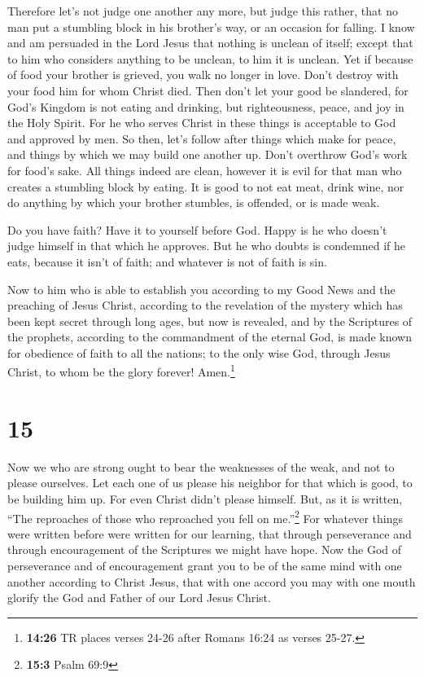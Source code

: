  Therefore let's not judge one another any more, but
judge this rather, that no man put a stumbling block in his brother's
way, or an occasion for falling.  I know and am persuaded
in the Lord Jesus that nothing is unclean of itself; except that to him
who considers anything to be unclean, to him it is unclean.
 Yet if because of food your brother is grieved, you walk
no longer in love. Don't destroy with your food him for whom Christ
died.  Then don't let your good be slandered,
 for God's Kingdom is not eating and drinking, but
righteousness, peace, and joy in the Holy Spirit.  For he
who serves Christ in these things is acceptable to God and approved by
men.  So then, let's follow after things which make for
peace, and things by which we may build one another up. 
Don't overthrow God's work for food's sake. All things indeed are clean,
however it is evil for that man who creates a stumbling block by eating.
 It is good to not eat meat, drink wine, nor do anything
by which your brother stumbles, is offended, or is made weak.

 Do you have faith? Have it to yourself before God. Happy
is he who doesn't judge himself in that which he approves.
 But he who doubts is condemned if he eats, because it
isn't of faith; and whatever is not of faith is sin.

 Now to him who is able to establish you according to my
Good News and the preaching of Jesus Christ, according to the revelation
of the mystery which has been kept secret through long ages,
 but now is revealed, and by the Scriptures of the
prophets, according to the commandment of the eternal God, is made known
for obedience of faith to all the nations;  to the only
wise God, through Jesus Christ, to whom be the glory forever!
Amen.\footnote{\textbf{14:26} TR places verses 24-26 after Romans 16:24
  as verses 25-27.}

\hypertarget{section-14}{%
\section{15}\label{section-14}}

 Now we who are strong ought to bear the weaknesses of the
weak, and not to please ourselves.  Let each one of us
please his neighbor for that which is good, to be building him up.
 For even Christ didn't please himself. But, as it is
written, ``The reproaches of those who reproached you fell on
me.''\footnote{\textbf{15:3} Psalm 69:9}  For whatever
things were written before were written for our learning, that through
perseverance and through encouragement of the Scriptures we might have
hope.  Now the God of perseverance and of encouragement
grant you to be of the same mind with one another according to Christ
Jesus,  that with one accord you may with one mouth
glorify the God and Father of our Lord Jesus Christ.

